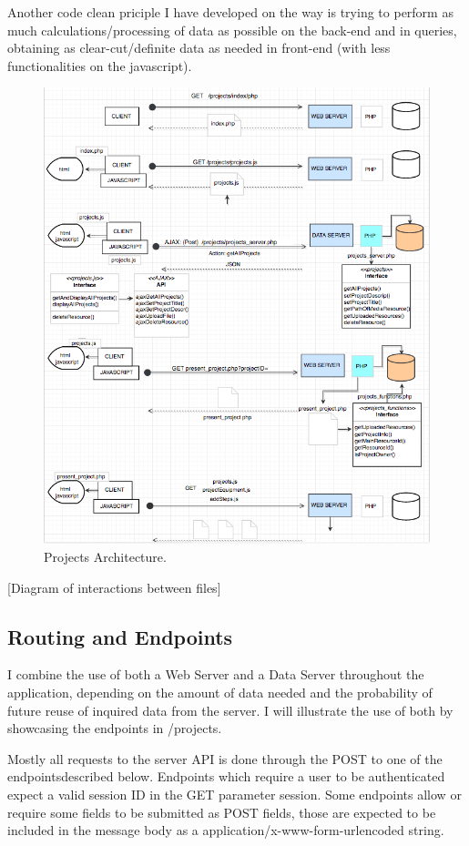 Another code clean priciple I have developed on the way is trying to perform as much calculations/processing of data as possible on the back-end and in queries, obtaining as clear-cut/definite data as needed in front-end (with less functionalities on the javascript). 

\begin{figure}
\includegraphics[width=0.8\linewidth]{images/ProjectsArchitecture.png}
\caption{Projects Architecture.}
\label{fig:projects_architecture.}
\end{figure}

[Diagram of interactions between files]


\subsection{Routing and Endpoints}

I combine the use of both a Web Server and a Data Server throughout the application, depending on the amount of data needed and the probability of future reuse of inquired data from the server. I will illustrate the use of both by showcasing the endpoints in /projects. 

Mostly all requests to the server API is done through the POST to one of the endpointsdescribed below. Endpoints which require a user to be authenticated expect a valid session ID in the GET parameter session. Some endpoints allow or require some fields to be submitted
as POST fields, those are expected to be included in the message body as a
application/x-www-form-urlencoded string.

